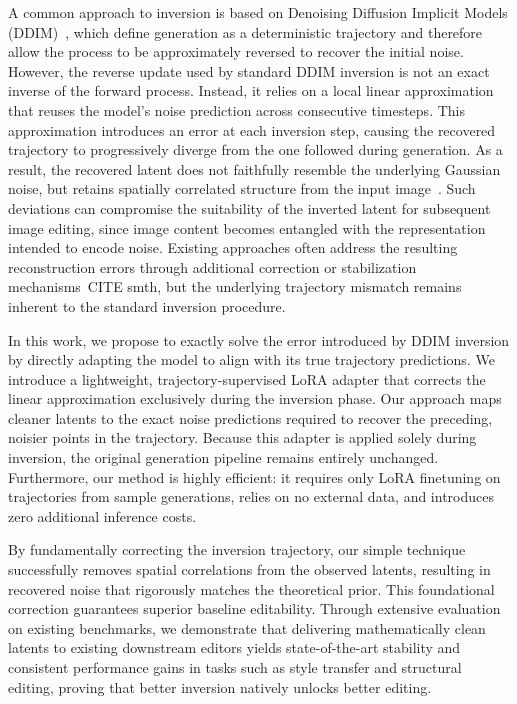 \documentclass{article} %
\newcommand{\kamil}[1]{{\color{orange}#1}}
\begin{document}
A common approach to inversion is based on Denoising Diffusion Implicit Models (DDIM)~\citep{song2020denoising}, which define generation as a deterministic trajectory and therefore allow the process to be approximately reversed to recover the initial noise. However, the reverse update used by standard DDIM inversion is not an exact inverse of the forward process. Instead, it relies on a local linear approximation that reuses the model's noise prediction across consecutive timesteps. This approximation introduces an error at each inversion step, causing the recovered trajectory to progressively diverge from the one followed during generation. As a result, the recovered latent does not faithfully resemble the underlying Gaussian noise, but retains spatially correlated structure from the input image~\citep{staniszewski2026there}. 
Such deviations can compromise the suitability of the inverted latent for subsequent image editing, since image content becomes entangled with the representation intended to encode noise. Existing approaches often address the resulting reconstruction errors through additional correction or stabilization mechanisms~\citep{}\kamil{CITE smth}, but the underlying trajectory mismatch remains inherent to the standard inversion procedure.

In this work, we propose to exactly solve the error introduced by DDIM inversion by directly adapting the model to align with its true trajectory predictions. We introduce a lightweight, trajectory-supervised LoRA adapter that corrects the linear approximation exclusively during the inversion phase. Our approach maps cleaner latents to the exact noise predictions required to recover the preceding, noisier points in the trajectory. Because this adapter is applied solely during inversion, the original generation pipeline remains entirely unchanged. Furthermore, our method is highly efficient: it requires only LoRA finetuning on trajectories from sample generations, relies on no external data, and introduces zero additional inference costs.

By fundamentally correcting the inversion trajectory, our simple technique successfully removes spatial correlations from the observed latents, resulting in recovered noise that rigorously matches the theoretical prior. This foundational correction guarantees superior baseline editability. Through extensive evaluation on existing benchmarks, we demonstrate that delivering mathematically clean latents to existing downstream editors yields state-of-the-art stability and consistent performance gains in tasks such as style transfer and structural editing, proving that better inversion natively unlocks better editing.
\end{document}
